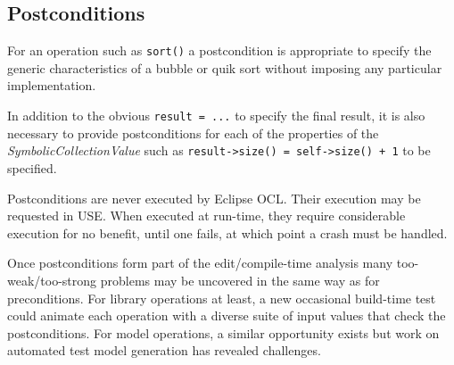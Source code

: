 \documentclass{llncs}
\begin{document}
\subsection{Postconditions}

For an operation such as \verb|sort()| a postcondition is appropriate to specify the generic characteristics of a bubble or quik sort without imposing any particular implementation. 

In addition to the obvious \verb|result = ...| to specify the final result, it is also necessary to provide postconditions for each of the properties of the \emph{SymbolicCollectionValue} such as 
\verb|result->size() = self->size() + 1| to be specified.


Postconditions are never executed by Eclipse OCL. Their execution may be requested in USE. When executed at run-time, they require considerable execution for no benefit, until one fails, at which point a crash must be handled.

Once postconditions form part of the edit/compile-time analysis many too-weak/too-strong problems may be uncovered in the same way as for preconditions. For library operations at least, a new occasional build-time test could animate each operation with a diverse suite of input values that check the postconditions. For model operations, a similar opportunity exists but work on automated test model generation has revealed challenges. 


\end{document}
